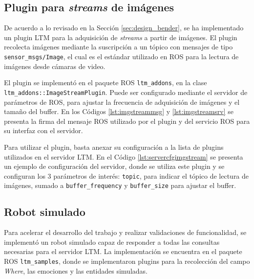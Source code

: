\subsection{Plugin para \textit{streams} de imágenes}

De acuerdo a lo revisado en la Sección \ref{sec:design_bender}, se ha implementado un plugin LTM para la adquisición de \textit{streams} a partir de imágenes. El plugin recolecta imágenes mediante la suscripción a un tópico con mensajes de tipo \texttt{sensor\_msgs/Image}, el cual es el estándar utilizado en ROS para la lectura de imágenes desde cámaras de video.

El plugin se implementó en el paquete ROS \texttt{ltm\_addons}, en la clase \texttt{ltm\_addons::ImageStreamPlugin}. Puede ser configurado mediante el servidor de parámetros de ROS, para ajustar la frecuencia de adquisición de imágenes y el tamaño del buffer. En los Códigos \ref{lst:imgstreammsg} y \ref{lst:imgstreamsrv} se presenta la firma del mensaje ROS utilizado por el plugin y del servicio ROS para su interfaz con el servidor.
\lstset{style=/Style/ROS/MSG}



Para utilizar el plugin, basta anexar su configuración a la lista de plugins utilizados en el servidor LTM. En el Código \ref{lst:servercfgimgstream} se presenta un ejemplo de configuración del servidor, donde se utiliza este plugin y se configuran los 3 parámetros de interés: \texttt{topic}, para indicar el tópico de lectura de imágenes, sumado a \texttt{buffer\_frequency} y \texttt{buffer\_size} para ajustar el buffer.
\lstset{style=/Style/yaml/ROS}




\subsection{Robot simulado}

Para acelerar el desarrollo del trabajo y realizar validaciones de funcionalidad, se implementó un robot simulado capaz de responder a todas las consultas necesarias para el servidor LTM. La implementación se encuentra en el paquete ROS \texttt{ltm\_samples}, donde se implementaron plugins para la recolección del campo \textit{Where}, las emociones y las entidades simuladas.

